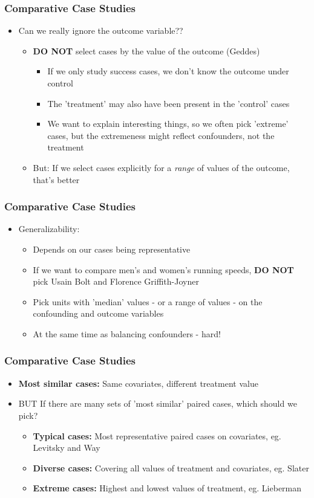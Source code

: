 \documentclass[xcolor=x11names,compress]{beamer}\usepackage[]{graphicx}\usepackage[]{color}
\renewcommand{\(}{\begin{columns}}
\renewcommand{\)}{\end{columns}}
\newcommand{\<}[1]{\begin{column}{#1}}
\renewcommand{\>}{\end{column}}
\begin{document}
\begin{frame}
\frametitle{Comparative Case Studies}
\begin{itemize}
\item Can we really ignore the outcome variable??
\pause
\begin{itemize}
\item \textbf{DO NOT} select cases by the value of the outcome (Geddes)
\begin{itemize}
\pause
\item If we only study success cases, we don't know the outcome under control
\pause
\item The 'treatment' may also have been present in the 'control' cases
\pause
\item We want to explain interesting things, so we often pick 'extreme' cases, but the extremeness might reflect confounders, not the treatment
\end{itemize}
\pause
\item But: If we select cases explicitly for a \textit{range} of values of the outcome, that's better
\end{itemize}
\end{itemize}
\end{frame}

\begin{frame}
\frametitle{Comparative Case Studies}
\begin{itemize}
\item Generalizability:
\pause
\begin{itemize}
\item Depends on our cases being representative
\pause
\item If we want to compare men's and women's running speeds, \textbf{DO NOT} pick Usain Bolt and Florence Griffith-Joyner
\pause
\item Pick units with 'median' values - or a range of values - on the confounding and outcome variables
\pause
\item At the same time as balancing confounders - hard!
\end{itemize}
\end{itemize}
\end{frame}

\begin{frame}
\frametitle{Comparative Case Studies}
\begin{itemize}
\item \textbf{Most similar cases:} Same covariates, different treatment value
\pause
\item BUT If there are many sets of 'most similar' paired cases, which should we pick?
\pause
\begin{itemize}
\item \textbf{Typical cases:} Most representative paired cases on covariates, eg. Levitsky and Way
\pause
\item \textbf{Diverse cases:} Covering all values of treatment and covariates, eg. Slater
\pause
\item \textbf{Extreme cases:} Highest and lowest values of treatment, eg. Lieberman
\end{itemize}
\end{itemize}
\end{frame}
\end{document}
